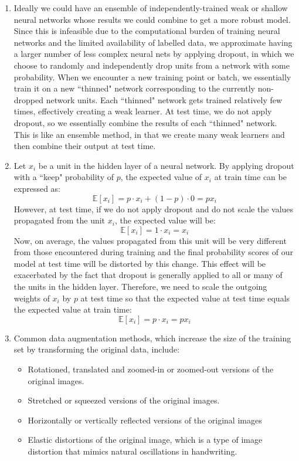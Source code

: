 \documentclass[a4paper]{article}
\begin{document}
\begin{enumerate}
\item{ Ideally we could have an ensemble of independently-trained weak or shallow neural networks whose results we could combine to get a more robust model. Since this is infeasible due to the computational burden of training neural networks and the limited availability of labelled data, we approximate having a larger number of less complex neural nets by applying dropout, in which we choose to randomly and independently drop units from a network with some probability. When we encounter a new training point or batch, we essentially train it on a new ``thinned" network corresponding to the currently non-dropped network units. Each ``thinned" network gets trained relatively few times, effectively creating a weak learner. At test time, we do not apply dropout, so we essentially combine the results of each ``thinned" network. This is like an ensemble method, in that we create many weak learners and then combine their output at test time. 

 }
\item{Let $x_i$ be a unit in the hidden layer of a neural network. By applying dropout with a ``keep" probability of $p$, the expected value of $x_i$ at train time can be expressed as:
$$\mathbb{E}[x_i] = p \cdot x_i + (1-p) \cdot 0 = p x_i   $$
However, at test time, if we do not apply dropout and do not scale the values propagated from the unit $x_i$, the expected value will be:
$$\mathbb{E}[x_i] = 1 \cdot x_i = x_i   $$
Now, on average, the values propagated from this unit will be very different from those encountered during training and the final probability scores of our model at test time will be distorted by this change. This effect will be exacerbated by the fact that dropout is generally applied to all or many of the units in the hidden layer. Therefore, we need to scale the outgoing weights of $x_i$ by $p$ at test time so that the expected value at test time equals the expected value at train time:
$$\mathbb{E}[x_i] = p \cdot x_i = p x_i   $$

}
\item{Common data augmentation methods, which increase the size of the training set by transforming the original data, include: 
\begin{itemize}
\item{Rotationed, translated and zoomed-in or zoomed-out versions of the original images.}
\item{Stretched or squeezed versions of the original images.}
\item{Horizontally or vertically reflected versions of the original images}
\item{Elastic distortions of the original image, which is a type of image distortion that mimics natural oscillations in handwriting.}
\end{itemize}

}
\end{enumerate}
\end{document}

